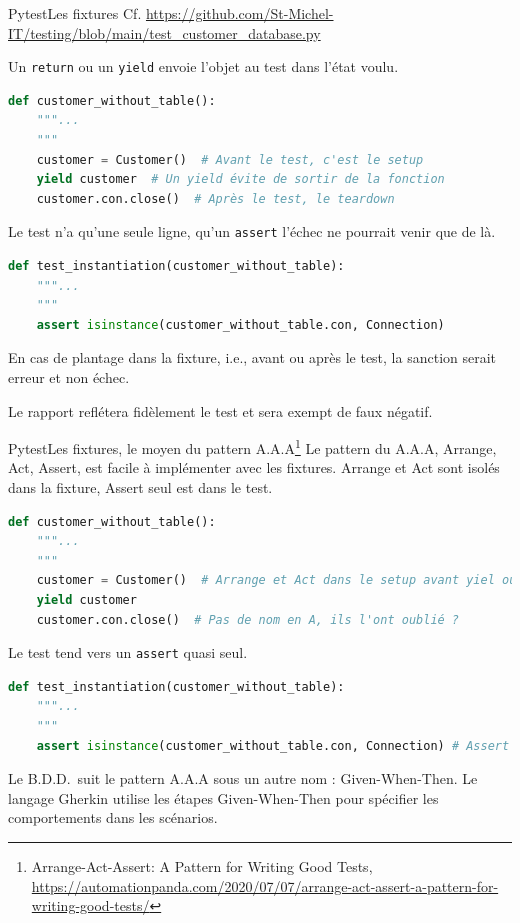\documentclass{beamer}
\begin{document}
    \begin{frame}[fragile]{Pytest}{Les fixtures}
        \transdissolve
        Cf. \url{https://github.com/St-Michel-IT/testing/blob/main/test_customer_database.py}

        Un \lstinline{return} ou un \lstinline{yield} envoie l'objet au test dans l'état voulu.
        \begin{lstlisting}[language=Python]
def customer_without_table():
    """...
    """
    customer = Customer()  # Avant le test, c'est le setup
    yield customer  # Un yield évite de sortir de la fonction
    customer.con.close()  # Après le test, le teardown
        \end{lstlisting}
        Le test n'a qu'une seule ligne, qu'un \lstinline{assert} l'échec ne
        pourrait venir que de là.
        \begin{lstlisting}[language=Python]
def test_instantiation(customer_without_table):
    """...
    """
    assert isinstance(customer_without_table.con, Connection)
        \end{lstlisting}
        En cas de plantage dans la fixture, i.e., avant ou après le test, la sanction
        serait erreur et non échec.

        Le rapport reflétera fidèlement le test et sera exempt de faux négatif.
    \end{frame}

    \begin{frame}[fragile]{Pytest}{Les fixtures, le moyen du pattern A.A.A\footnote{Arrange-Act-Assert: A Pattern for Writing Good Tests, \url{https://automationpanda.com/2020/07/07/arrange-act-assert-a-pattern-for-writing-good-tests/}}}
        \transdissolve
        Le pattern du A.A.A, Arrange, Act, Assert, est facile à implémenter avec les fixtures.
        Arrange et Act sont isolés dans la fixture, Assert seul est dans le test.

        \begin{lstlisting}[language=Python]
def customer_without_table():
    """...
    """
    customer = Customer()  # Arrange et Act dans le setup avant yiel ou return
    yield customer
    customer.con.close()  # Pas de nom en A, ils l'ont oublié ?
        \end{lstlisting}
        Le test tend vers un \lstinline{assert} quasi seul.
        \begin{lstlisting}[language=Python]
def test_instantiation(customer_without_table):
    """...
    """
    assert isinstance(customer_without_table.con, Connection) # Assert
        \end{lstlisting}
        Le B.D.D.~suit le pattern A.A.A sous un autre nom : Given-When-Then.
        Le langage Gherkin utilise les étapes Given-When-Then pour spécifier les comportements dans les scénarios.
    \end{frame}
\end{document}
